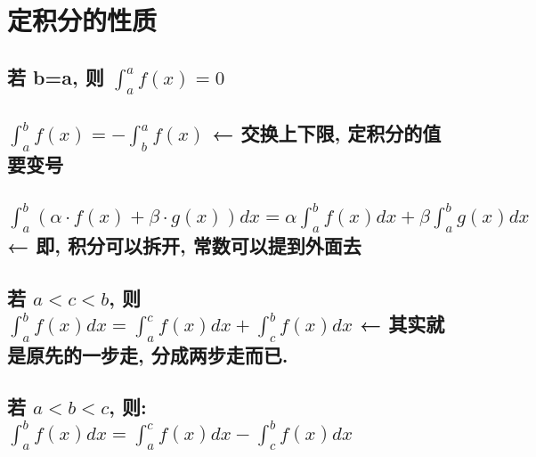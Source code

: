 \documentclass[UTF8]{ctexart}
\begin{document}
	
	
	
	
	\section{定积分的性质}
	
	\subsection{若 b=a, 则 $ \int_a^a f(x) = 0$}
	
	\subsection{$ \int_a^b f(x) = -  \int_b^a f(x)$  ← 交换上下限, 定积分的值要变号}
	
	\subsection{$\int_a^b (\alpha \cdot f(x) + \beta \cdot g(x)) dx = \alpha \int_a^b  f(x) dx + \beta \int_a^b  g(x) dx$ ← 即, 积分可以拆开, 常数可以提到外面去}
	
	\subsection{ 若 $ a < c < b$, 则 $ \int_a^b f(x) dx = \int_a^c f(x) dx + \int_c^b f(x) dx $ ← 其实就是原先的一步走, 分成两步走而已.}
	
	
	\subsection{ 若 $ a < b < c$, 则: $ \int_a^b f(x) dx = \int_a^c f(x) dx - \int_c^b f(x) dx$}
	
	
	
	
	
	
	
	
	
	
	
	
	
	
	
	
\end{document}
